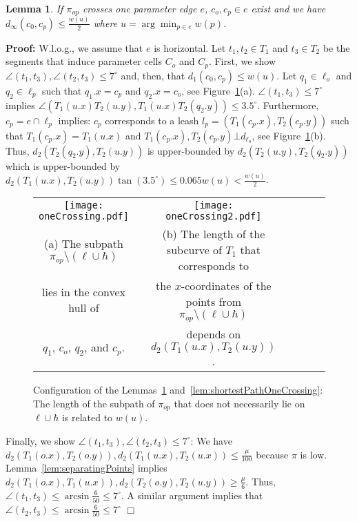 \documentclass[a4paper,11pt]{article}
\newtheorem{lemma}{Lemma}
\newenvironment{proof}{\textbf{Proof:}}{\hspace*{0mm}\hfill\ensuremath{\Box}}
\begin{document}
\begin{lemma}\label{lem:oneCrossing}
	If $\pi_{op}$ crosses one parameter edge $e$, $c_o,c_p \in e$ exist and we have $d_{\infty}(c_0,c_p) \leq \frac{w(u)}{2}$ where $u = \arg \min_{p \in e} w(p)$.
\end{lemma}
\begin{proof} W.l.o.g., we assume that $e$ is horizontal. Let $t_1,t_2 \in T_1$ and $t_3 \in T_2$ be the segments that induce  parameter cells $C_o$ and $C_p$. First, we show $\angle (t_1,t_3), \angle (t_2,t_3) \leq 7^{\circ}$ and, then, that $d_1(c_0,c_p) \leq w(u)$. Let $q_1 \in \ell_o$ and $q_2 \in \ell_p$ such that $q_1.x = c_p$ and $q_2.x = c_o$, see Figure~\ref{fig:oneCrossing}(a). $\angle (t_1,t_3) \leq 7^{\circ}$ implies $\angle (T_1(u.x)T_2(u.y), T_1(u.x)T_2(q_2.y))\leq 3.5^{\circ}$. Furthermore, $c_p = e \cap \ell_p$ implies: $c_p$ corresponds to a leash $l_p = (T_1(c_p.x), T_2(c_p.y))$ such that $T_1(c_p.x) = T_1(u.x)$ and $T_1(c_p.x), T_2(c_p.y) \bot d_{\ell_o}$, see Figure~\ref{fig:oneCrossing}(b). Thus, $d_2(T_2(q_2.y),T_2(u.y))$ is upper-bounded by $d_2(T_2(u.y), T_2(q_2.y))$ which is upper-bounded by $d_2(T_1(u.x),T_2(u.y))\tan (3.5^{\circ}) \leq 0.065 w(u) < \frac{w(u)}{2}$.




\begin{figure}[ht]
  \begin{center}
    \begin{tabular}{ccccccc}
      \texttt{[image: oneCrossing.pdf]} & &
       \texttt{[image: oneCrossing2.pdf]}&&\\ 
{\small (a) The subpath $\pi_{op} \setminus (\ell \cup \hbar)$} & &
      {\small (b) The length of the subcurve of $T_1$ that corresponds to}&&\\
      {\small lies in the convex hull of}& &
      {\small the $x$-coordinates of the points from $\pi_{op} \setminus (\ell \cup \hbar)$}&&\\
      {\small $q_1$, $c_o$, $q_2$, and $c_p$.}&&
      {\small depends on $d_2(T_1(u.x),T_2(u.y))$.}&&
    \end{tabular}
  \end{center}
  \vspace*{-12pt}
  \caption{Configuration of the Lemmas~\ref{lem:oneCrossing} and~\ref{lem:shortestPathOneCrossing}: The length of the subpath of $\pi_{op}$ that does not necessarily lie on $\ell \cup \hbar$ is related to $w(u)$.}
  \label{fig:oneCrossing}
\end{figure}

	Finally, we show $\angle (t_1,t_3), \angle (t_2,t_3) \leq 7^{\circ}$: We have $d_2(T_1(o.x), T_2(o.y)), d_2(T_1(u.x), T_2(u.x)) \leq \frac{\mu}{100}$ because $\pi$ is low. Lemma~\ref{lem:separatingPoints} implies $d_2(T_1(o.x),T_1(u.x)), d_2(T_2(o.y), T_2(u.y)) \geq \frac{\mu}{6}$. Thus, $\angle (t_1,t_3) \leq \arcsin \frac{6}{50} \leq 7^{\circ}$. A similar argument implies that $\angle (t_2,t_3) \leq \arcsin \frac{6}{50} \leq 7^{\circ}$
\end{proof}
	
\end{document}
